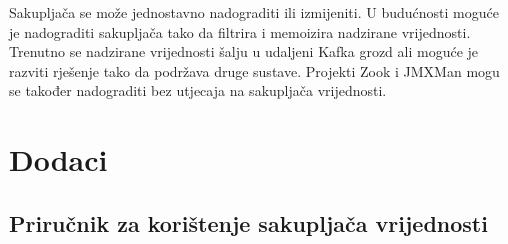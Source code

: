 \documentclass[utf8, diplomski, lmodern, numeric]{fer}
\begin{document}
Sakupljača se može jednostavno nadograditi ili izmijeniti. U budućnosti moguće je nadograditi sakupljača tako da filtrira i memoizira nadzirane vrijednosti. Trenutno se nadzirane vrijednosti šalju u udaljeni Kafka grozd ali moguće je razviti rješenje tako da podržava druge sustave. Projekti Zook i JMXMan mogu se također nadograditi bez utjecaja na sakupljača vrijednosti.



\chapter{Dodaci}


\section{Priručnik za korištenje sakupljača vrijednosti}
\end{document}
